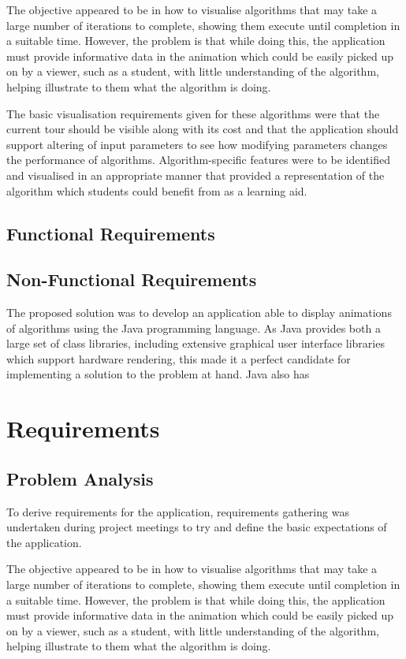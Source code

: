 \documentclass{l4proj}
\begin{document}
The objective appeared to be in how to visualise algorithms that may take a large number of iterations to complete, showing them execute until 
completion in a suitable time. However, the problem is that while doing this, the application must provide informative data in the animation 
which could be easily picked up on by a viewer, such as a student, with little understanding of the algorithm, helping illustrate to them 
what the algorithm is doing.

The basic visualisation requirements given for these algorithms were that the current tour should be visible along with its cost and 
that the application should support altering of input parameters to see how modifying parameters changes the performance of algorithms. 
Algorithm-specific features were to be identified and visualised in an appropriate manner that provided a representation of the 
algorithm which students could benefit from as a learning aid.

\section{Functional Requirements}

\section{Non-Functional Requirements}
The proposed solution was to develop an application able to display animations of algorithms using the Java programming 
language. As Java provides both a large set of class libraries, including extensive graphical user interface libraries which 
support hardware rendering, this made it a perfect candidate for implementing a solution to the problem at hand. Java also has 


\chapter{Requirements}
\label{requirements}
\section{Problem Analysis}
To derive requirements for the application, requirements gathering was undertaken during project meetings to try and define the basic 
expectations of the application.

The objective appeared to be in how to visualise algorithms that may take a large number of iterations to complete, showing them execute until 
completion in a suitable time. However, the problem is that while doing this, the application must provide informative data in the animation 
which could be easily picked up on by a viewer, such as a student, with little understanding of the algorithm, helping illustrate to them 
what the algorithm is doing.
\end{document}
